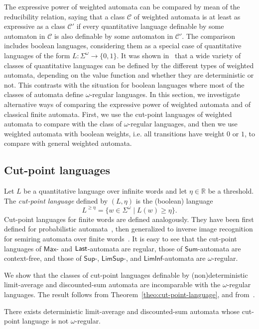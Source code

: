 \documentclass{llncs}
\newcommand{\real}{{\mathbb R}}
\newcommand{\C}{\mathcal{C}}
\newcommand{\Last}{{\sf Last}}
\newcommand{\Maxf}{\mathsf{Max}}
\newcommand{\Max}{\mathsf{Sup}}
\newcommand{\LimSup}{\mathsf{LimSup}}
\newcommand{\LimInf}{\mathsf{LimInf}}
\newcommand{\Sum}{\mathsf{Sum}}
\begin{document}
The expressive power of weighted automata can be compared by mean of the
reducibility relation, saying that a class $\C$ of weighted automata  is at least
as expressive as a class $\C'$ if every quantitative language definable
by some automaton in $\C$ is also definable by some automaton in $\C'$.
The comparison includes boolean languages, considering them as a special case of quantitative languages
of the form $L:\Sigma^{\omega} \to \{0,1\}$.
It was shown in~\cite{CDH08} that a wide variety of classes of quantitative languages
can be defined by the different types of weighted automata, depending on the
value function and whether they are deterministic or not. This contrasts with
the situation for boolean languages where most of the classes of automata define
$\omega$-regular languages.
In this section, we investigate alternative ways of comparing the expressive power
of weighted automata and of classical finite automata. 
First, we use the cut-point languages of weighted automata to compare with
the class of $\omega$-regular languages, and then we use weighted automata
with boolean weights, i.e. all transitions have weight $0$ or $1$, to compare 
with general weighted automata.

\subsection{Cut-point languages}

Let $L$ be a quantitative language over infinite words and let $\eta \in \real$ be a threshold.
The \emph{cut-point language} defined by $(L,\eta)$ is the (boolean) language
$$L^{\geq \eta} = \{w \in \Sigma^{\omega} \mid L(w) \geq \eta\}.$$
Cut-point languages for finite words are defined analogously. They
have been first defined for probabilistic automata~\cite{Rabin63},
then generalized to inverse image recognition for semiring automata over finite words~\cite{CortesM00}.
It is easy to see that the cut-point languages of $\Maxf$- and $\Last$-automata are regular,
those of $\Sum$-automata are context-free, and 
those of $\Max$-, $\LimSup$-, and $\LimInf$-automata are $\omega$-regular.

We show that the classes of cut-point languages definable by (non)deterministic limit-average and 
discounted-sum automata are incomparable with the $\omega$-regular languages. 
The result follows from Theorem~\ref{theo:cut-point-language}, 
and from~\cite[Theorems 13 and 14]{CDH08}.

\begin{theorem}\label{theo:cut-point-language}
There exists deterministic limit-average and discounted-sum automata
whose cut-point language is not $\omega$-regular.
\end{theorem}
\end{document}
